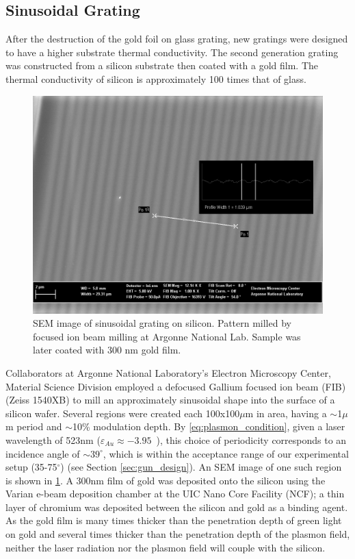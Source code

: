 \subsection{Sinusoidal Grating}

After the destruction of the gold foil on glass grating, new gratings were designed to have a higher substrate thermal conductivity.
The second generation grating was constructed from a silicon substrate then coated with a gold film.
The thermal conductivity of silicon is approximately 100 times that of glass. %

\begin{figure}
  \centering
  \includegraphics{HighMagSEM.jpg}
  \caption[SEM image of sinusoidal grating on silicon]{
    SEM image of sinusoidal grating on silicon.
    Pattern milled by focused ion beam milling at Argonne National Lab.
    Sample was later coated with 300 nm gold film.
  }
  \label{fig:fib-si-sem}
\end{figure}

Collaborators at Argonne National Laboratory's Electron Microscopy Center, Material Science Division employed a defocused Gallium focused ion beam (FIB) (Zeiss 1540XB) to mill an approximately sinusoidal shape into the surface of a silicon wafer.
Several regions were created each 100x100$\mu$m in area, having a $\sim$1$\mu$m period and $\sim$10\% modulation depth.
By \ref{eq:plasmon_condition}, given a laser wavelength of 523nm ($\varepsilon_{Au} \approx -3.95$~\cite{johnson_optical_1972}), this choice of periodicity corresponds to an incidence angle of $\sim39^{\circ}$, which is within the acceptance range of our experimental setup (35-75$^{\circ}$) (see Section \ref{sec:gun_design}).
An SEM image of one such region is shown in \ref{fig:fib-si-sem}.
A 300nm film of gold was deposited onto the silicon using the Varian e-beam deposition chamber at the UIC Nano Core Facility (NCF); a thin layer of chromium was deposited between the silicon and gold as a binding agent.
As the gold film is many times thicker than the penetration depth of green light on gold and several times thicker than the penetration depth of the plasmon field, neither the laser radiation nor the plasmon field will couple with the silicon.

